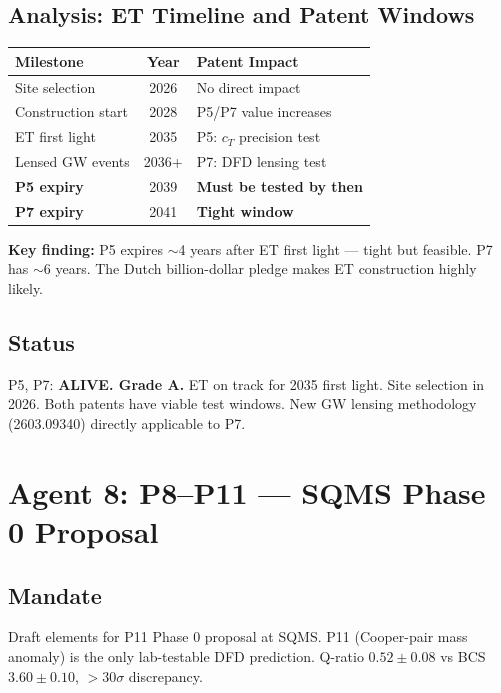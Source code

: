 \documentclass[11pt,a4paper]{article}
\begin{document}
\subsection{Analysis: ET Timeline and Patent Windows}

\begin{center}
\begin{tabular}{lcl}
\toprule
\textbf{Milestone} & \textbf{Year} & \textbf{Patent Impact} \\
\midrule
Site selection & 2026 & No direct impact \\
Construction start & 2028 & P5/P7 value increases \\
ET first light & 2035 & P5: $c_T$ precision test \\
Lensed GW events & 2036+ & P7: DFD lensing test \\
\textbf{P5 expiry} & 2039 & \textbf{Must be tested by then} \\
\textbf{P7 expiry} & 2041 & \textbf{Tight window} \\
\bottomrule
\end{tabular}
\end{center}

\textbf{Key finding:} P5 expires $\sim$4 years after ET first light --- tight but feasible. P7 has $\sim$6 years. The Dutch billion-dollar pledge makes ET construction highly likely.

\subsection{Status}
P5, P7: \textbf{ALIVE. Grade A.} ET on track for 2035 first light. Site selection in 2026. Both patents have viable test windows. New GW lensing methodology (2603.09340) directly applicable to P7.

\section{Agent 8: P8--P11 --- SQMS Phase 0 Proposal}

\subsection{Mandate}
Draft elements for P11 Phase 0 proposal at SQMS. P11 (Cooper-pair mass anomaly) is the only lab-testable DFD prediction. Q-ratio $0.52 \pm 0.08$ vs BCS $3.60 \pm 0.10$, $>30\sigma$ discrepancy.
\end{document}
